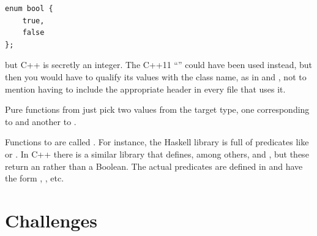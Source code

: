 \begin{verbatim}
enum bool { 
    true,
    false
};
\end{verbatim}
but C++  is secretly an integer. The C++11
``'' could have been used instead, but then you
would have to qualify its values with the class name, as in
 and , not to mention having to
include the appropriate header in every file that uses it.

Pure functions from  just pick two values from the target
type, one corresponding to  and another to .

Functions to  are called . For instance,
the Haskell library  is full of predicates like
 or . In C++ there is a similar library
\code{} that defines, among others,  and
, but these return an  rather than a
Boolean. The actual predicates are defined in  and
have the form ,
, etc.

\section{Challenges}\label{challenges}

